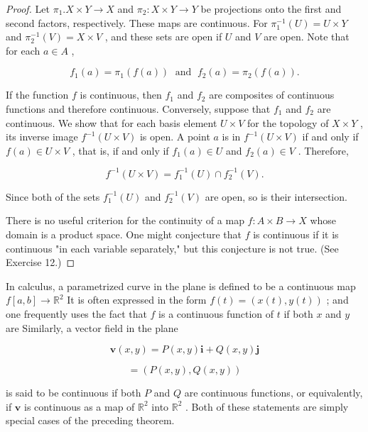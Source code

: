 \begin{proof}
Let \({\pi }_{1}.X \times  Y \rightarrow  X\) and \({\pi }_{2} : X \times  Y \rightarrow  Y\) be projections onto the first and second factors, respectively. These maps are continuous. For \({\pi }_{1}^{-1}\left( U\right)  = U \times  Y\) and \({\pi }_{2}^{-1}\left( V\right)  = X \times  V\) , and these sets are open if \(U\) and \(V\) are open. Note that for each \(a \in  A\) ,

\[
{f}_{1}\left( a\right)  = {\pi }_{1}\left( {f\left( a\right) }\right) \;\text{ and }\;{f}_{2}\left( a\right)  = {\pi }_{2}\left( {f\left( a\right) }\right) .
\]

If the function \(f\) is continuous, then \({f}_{1}\) and \({f}_{2}\) are composites of continuous functions and therefore continuous. Conversely, suppose that \({f}_{1}\) and \({f}_{2}\) are continuous. We show that for each basis element \(U \times  V\) for the topology of \(X \times  Y\) , its inverse image \({f}^{-1}\left( {U \times  V}\right)\) is open. A point \(a\) is in \({f}^{-1}\left( {U \times  V}\right)\) if and only if \(f\left( a\right)  \in  U \times  V\) , that is, if and only if \({f}_{1}\left( a\right)  \in  U\) and \({f}_{2}\left( a\right)  \in  V\) . Therefore,

\[
{f}^{-1}\left( {U \times  V}\right)  = {f}_{1}^{-1}\left( U\right)  \cap  {f}_{2}^{-1}\left( V\right) .
\]

Since both of the sets \({f}_{1}^{-1}\left( U\right)\) and \({f}_{2}^{-1}\left( V\right)\) are open, so is their intersection.

There is no useful criterion for the continuity of a map \(f : A \times  B \rightarrow  X\) whose domain is a product space. One might conjecture that \(f\) is continuous if it is continuous "in each variable separately," but this conjecture is not true. (See Exercise 12.)
\end{proof}

\begin{example} In calculus, a parametrized curve in the plane is defined to be a continuous map \(f\left\lbrack  {a,b}\right\rbrack   \rightarrow  {\mathbb{R}}^{2}\) It is often expressed in the form \(f\left( t\right)  = \left( {x\left( t\right) ,y\left( t\right) }\right)\) ; and one frequently uses the fact that \(f\) is a continuous function of \(t\) if both \(x\) and \(y\) are Similarly, a vector field in the plane

\[
\mathbf{v}\left( {x,y}\right)  = P\left( {x,y}\right) \mathbf{i} + Q\left( {x,y}\right) \mathbf{j}
\]

\[
= \left( {P\left( {x,y}\right) ,Q\left( {x,y}\right) }\right)
\]

is said to be continuous if both \(P\) and \(Q\) are continuous functions, or equivalently, if \(\mathbf{v}\) is continuous as a map of \({\mathbb{R}}^{2}\) into \({\mathbb{R}}^{2}\) . Both of these statements are simply special cases of the preceding theorem.
\end{example}


